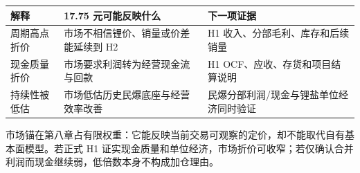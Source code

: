 \begin{exhibitbox}[表 7-2：现价隐含的三种竞争性解释]
\begin{tabularx}{\exhibitboxwidth}{L{3.2cm}X X}
\toprule
解释 & 17.75 元可能反映什么 & 下一项证据 \\
\midrule
周期高点折价 & 市场不相信锂价、销量或价差能延续到 H2 & H1 收入、分部毛利、库存和后续销量 \\
现金质量折价 & 市场要求利润转为经营现金流与回款 & H1 OCF、应收、存货和项目结算说明 \\
持续性被低估 & 市场低估历史民爆底座与经营效率改善 & 民爆分部利润/现金与锂盐单位经济同时验证 \\
\bottomrule
\end{tabularx}
\end{exhibitbox}

市场锚在第八章占有限权重：它能反映当前交易可观察的定价，却不能取代自有基本面模型。若正式 H1 证实现金质量和单位经济，市场折价可收窄；若仅确认合并利润而现金继续弱，低倍数本身不构成加仓理由。
